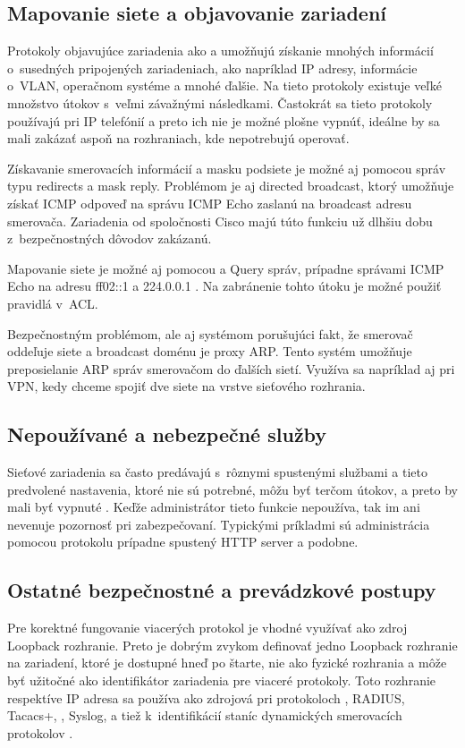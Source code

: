 \subsection{Mapovanie siete a objavovanie zariadení}
Protokoly objavujúce zariadenia ako  a  umožňujú získanie mnohých informácií o~susedných pripojených zariadeniach, ako napríklad IP adresy, informácie o~VLAN, operačnom systéme a mnohé ďalšie. Na tieto protokoly existuje veľké množstvo útokov s~veľmi závažnými následkami. Častokrát sa tieto protokoly používajú pri IP telefónií a preto ich nie je možné plošne vypnúť, ideálne by sa mali zakázať aspoň na rozhraniach, kde nepotrebujú operovať. 

Získavanie smerovacích informácií a masku podsiete je možné aj pomocou správ  typu redirects a mask reply. Problémom je aj directed broadcast, ktorý umožňuje získať ICMP odpoveď na správu ICMP Echo zaslanú na broadcast adresu smerovača. Zariadenia od spoločnosti Cisco majú túto funkciu už dlhšiu dobu z~bezpečnostných dôvodov zakázanú. 

Mapovanie siete je možné aj pomocou  a  Query správ, prípadne správami ICMP Echo na adresu ff02::1 a 224.0.0.1 \cite{Rey2016}\cite{Podermanski532015}. Na zabránenie tohto útoku je možné použiť pravidlá v~ACL. 

Bezpečnostným problémom, ale aj systémom porušujúci fakt, že smerovač oddeľuje siete a broadcast doménu je proxy ARP. Tento systém umožňuje preposielanie ARP správ smerovačom do ďalších sietí. Využíva sa napríklad aj pri VPN, kedy chceme spojiť dve siete na vrstve sieťového rozhrania. 

\subsection{Nepoužívané a nebezpečné služby}
Sieťové zariadenia sa často predávajú s~rôznymi spustenými službami a tieto predvolené nastavenia, ktoré nie sú potrebné, môžu byť terčom útokov, a preto by mali byť vypnuté \cite{CIS_DrTLsgXv24lxeIIM}. Keďže administrátor tieto funkcie nepoužíva, tak im ani nevenuje pozornosť pri zabezpečovaní. Typickými príkladmi sú administrácia pomocou protokolu  prípadne spustený HTTP server a podobne. 

\subsection{Ostatné bezpečnostné a prevádzkové postupy}
Pre korektné fungovanie viacerých protokol je vhodné využívať ako zdroj Loopback rozhranie. Preto je dobrým zvykom definovať jedno Loopback rozhranie na zariadení, ktoré je dostupné hneď po štarte, nie ako fyzické rozhrania a môže byť užitočné ako identifikátor zariadenia pre viaceré protokoly. Toto rozhranie respektíve IP adresa sa používa ako zdrojová pri protokoloch , RADIUS, Tacacs+, , Syslog,  a tiež k~identifikácií staníc dynamických smerovacích protokolov \cite{Jackson2010} \cite{Singh2018} \cite{CIS_DrTLsgXv24lxeIIM}.
